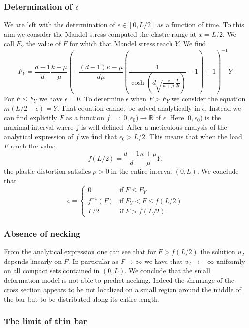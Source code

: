 \documentclass[a4paper,10pt,oneside]{amsbook}
\numberwithin{section}{chapter}
\numberwithin{equation}{chapter}
\theoremstyle{definition}
\begin{document}
\subsubsection*{Determination of $\epsilon$}

We are left with the determination of $\epsilon\in[0,L/2]$ as a function of time. To this aim we consider the Mandel stress computed the elastic range at $x=L/2$. We call $F_Y$ the value of $F$ for which that Mandel stress reach $Y$. We find
\[
F_Y=\frac{d-1}{d}\frac{k+\mu}{\mu}\left(-\frac{(d-1)\kappa-\mu}{d\mu}\left(\frac{1}{\cosh\left(d\sqrt{\frac{\kappa}{\kappa+\mu}}\frac{L}{2l}\right)}-1\right)+1\right)^{-1}Y.
\]
For $F\le F_Y$ we have $\epsilon=0$. To determine $\epsilon$ when $F>F_Y$ we consider the equation $m(L/2-\epsilon)=Y$. That equation cannot be solved analytically in $\epsilon$. Instead we can find explicitly $F$ as a function $f=\colon[0,\epsilon_0)\to\mathbb{R}$ of $\epsilon$. Here $[0,\epsilon_0)$ is the maximal interval where $f$ is well defined. After a meticulous analysis of the analytical expression of $f$ we find that $\epsilon_0>L/2$. This means that when the load $F$ reach the value
\[
f(L/2)=\frac{d-1}{d}\frac{\kappa+\mu}{\mu}Y,
\]
the plastic distortion satisfies $p>0$ in the entire interval $(0,L)$. We conclude that
\[
\epsilon=\begin{cases}
0 & \text{if $F\le F_Y$} \\
f^{-1}(F) & \text{if $F_Y<F\le f(L/2)$} \\
L/2 & \text{if $F>f(L/2)$}.
\end{cases}
\]

\subsubsection*{Absence of necking}

From the analytical expression one can see that for $F>f(L/2)$ the solution $u_2$ depends linearly on $F$. In particular as $F\to\infty$ we have that $u_2\to-\infty$ uniformly on all compact sets contained in $(0,L)$. We conclude that the small deformation model is not able to predict necking. Indeed the shrinkage of the cross section appears to be not localized on a small region around the middle of the bar but to be distributed along its entire length.

\subsubsection*{The limit of thin bar}
\end{document}
